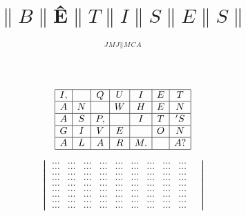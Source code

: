 \documentclass[titlepage, 12pt]{article}
\title{{$\|B\|$\^E$\|T\|I\|S\|E\|S\|$}}
\author{${}^J{}^M{}^J{}^\| {}^M{}^C{}^A$}
\date{}
\begin{document}
\maketitle

\begin{equation*}
    \left.
    \begin{array}{|c|c|c|c|c|c|c|}
        \hline I, & {} & Q & U & I & E & T \\
        \hline A & N & {} & W & H & E & N \\
        \hline A & S & P, & {} & I & T & 'S \\
        \hline G & I & V & E & {} & O & N \\
        \hline A & L & A & R & M. & {} & A? \\
        \hline 
    \end{array}
    \right.
\end{equation*}

\center
\break%

\begin{equation*} 
    \begin{vmatrix}
         \dots & \dots & \dots & \dots & \dots & \dots & \dots & \dots & \dots & \\%
         \dots & \dots & \dots & \dots & \dots & \dots & \dots & \dots & \dots & \\ %
         \dots & \dots & \dots & \dots & \dots & \dots & \dots & \dots & \dots & \\ %
          \dots & \dots & \dots & \dots & \dots & \dots & \dots & \dots & \dots & \\%
         \dots & \dots & \dots & \dots & \dots & \dots & \dots & \dots & \dots & \\ %
         \dots & \dots & \dots & \dots & \dots & \dots & \dots & \dots & \dots & \\ 
          \dots & \dots & \dots & \dots & \dots & \dots & \dots & \dots & \dots & \\
         \dots & \dots & \dots & \dots & \dots & \dots & \dots & \dots & \dots & \\ 
         \dots & \dots & \dots & \dots & \dots & \dots & \dots & \dots & \dots & 
\end{vmatrix} 
\end{equation*}
\end{document}
